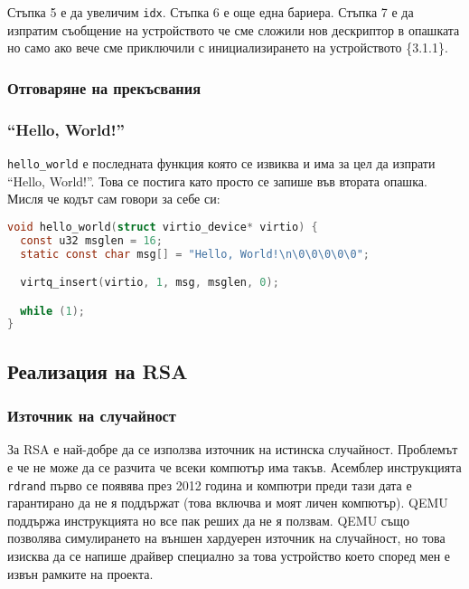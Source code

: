 Стъпка 5 е да увеличим {\tt idx}. Стъпка 6 е още една бариера. Стъпка 7 е да изпратим съобщение на устройството че сме сложили нов дескриптор в опашката но само ако вече сме приключили с инициализирането на устройството \{3.1.1\}.

\subsubsection{Отговаряне на прекъсвания}

\subsubsection{``Hello, World!''}
{\tt hello\_world} е последната функция която се извиква и има за цел да изпрати ``Hello, World!''. Това се постига като просто се запише във втората опашка. Мисля че кодът сам говори за себе си:
\begin{lstlisting}[language=C]
void hello_world(struct virtio_device* virtio) {
  const u32 msglen = 16;
  static const char msg[] = "Hello, World!\n\0\0\0\0\0";

  virtq_insert(virtio, 1, msg, msglen, 0);

  while (1);
}
\end{lstlisting}

\subsection{Реализация на RSA}
\subsubsection{Източник на случайност}
За RSA е най-добре да се използва източник на истинска случайност. Проблемът е че не може да се разчита че всеки компютър има такъв. Асемблер инструкцията {\tt rdrand} първо се появява през 2012 година и компютри преди тази дата е гарантирано да не я поддържат (това включва и моят личен компютър). QEMU поддържа инструкцията но все пак реших да не я ползвам. QEMU също позволява симулирането на външен хардуерен източник на случайност, но това изисква да се напише драйвер специално за това устройство което според мен е извън рамките на проекта.

